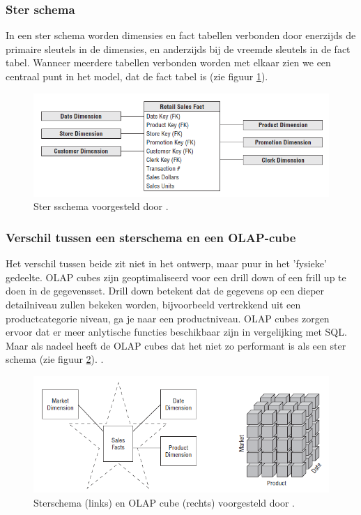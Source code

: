 \subsubsection{Ster schema}
In een ster schema worden dimensies en fact tabellen verbonden door enerzijds de primaire sleutels in de dimensies, en anderzijds bij de vreemde sleutels in de fact tabel. Wanneer meerdere tabellen verbonden worden met elkaar zien we een centraal punt in het model, dat de fact tabel is (zie figuur \ref{fig:ster}). 

\begin{figure}[h]
	\includegraphics[scale=0.8]{../images/ster.PNG}
	\caption{Ster sschema voorgesteld door \textcite{Kimball2013}.}
	\label{fig:ster}
\end{figure}

\subsubsection{Verschil tussen een sterschema en een OLAP-cube}
Het verschil tussen beide zit niet in het ontwerp, maar puur in het 'fysieke' gedeelte.
OLAP cubes zijn geoptimaliseerd voor een drill down of een frill up te doen in de gegevensset.
Drill down betekent dat de gegevens op een dieper detailniveau zullen bekeken worden, bijvoorbeeld vertrekkend uit een productcategorie niveau, ga je naar een productniveau. OLAP cubes zorgen ervoor dat er meer anlytische functies beschikbaar zijn in vergelijking met SQL. Maar als nadeel heeft de OLAP cubes dat het niet zo performant is als een ster schema  (zie figuur \ref{fig:stervsolap}).  \autocite{Kimball2013}. 

\begin{figure}[h]
	\includegraphics[scale=0.8]{../images/starvsolap.PNG}
	\caption{Sterschema (links) en OLAP cube (rechts) voorgesteld door \textcite{Kimball2013}.}
	\label{fig:stervsolap}
\end{figure}


